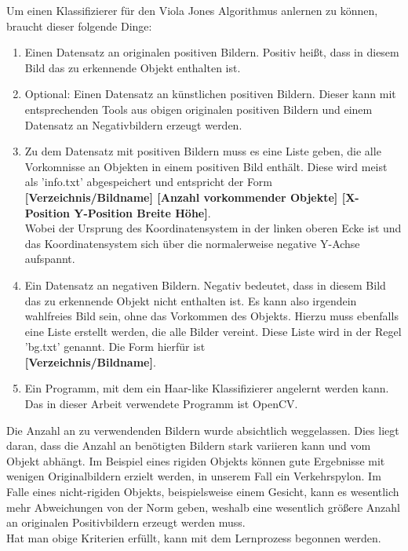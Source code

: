 Um einen Klassifizierer für den Viola Jones Algorithmus anlernen zu können, braucht dieser folgende Dinge:
\begin{enumerate}
\item Einen Datensatz an originalen positiven Bildern. Positiv heißt, dass in diesem Bild das zu erkennende Objekt enthalten ist.
\item Optional: Einen Datensatz an künstlichen positiven Bildern. Dieser kann mit entsprechenden Tools aus obigen originalen positiven Bildern und einem Datensatz an Negativbildern erzeugt werden.
\item Zu dem Datensatz mit positiven Bildern muss es eine Liste geben, die alle Vorkomnisse an Objekten in einem positiven Bild enthält. Diese wird meist als 'info.txt' abgespeichert und entspricht der Form \\
\textbf{[Verzeichnis/Bildname] [Anzahl vorkommender Objekte] [X-Position Y-Position Breite Höhe]}. \label{sec:info_txt}\\
Wobei der Ursprung des Koordinatensystem in der linken oberen Ecke ist und das Koordinatensystem sich über die normalerweise negative Y-Achse aufspannt.
\item Ein Datensatz an negativen Bildern. Negativ bedeutet, dass in diesem Bild das zu erkennende Objekt nicht enthalten ist. Es kann also irgendein wahlfreies Bild sein, ohne das Vorkommen des Objekts. Hierzu muss ebenfalls eine Liste erstellt werden, die alle Bilder vereint. Diese Liste wird in der Regel 'bg.txt' genannt. Die Form hierfür ist \\
\textbf{[Verzeichnis/Bildname]}.
\item Ein Programm, mit dem ein Haar-like Klassifizierer angelernt werden kann. Das in dieser Arbeit verwendete Programm ist OpenCV.
\end{enumerate}
Die Anzahl an zu verwendenden Bildern wurde absichtlich weggelassen. Dies liegt daran, dass die Anzahl an benötigten Bildern stark variieren kann und vom Objekt abhängt. Im Beispiel eines rigiden Objekts können gute Ergebnisse mit wenigen Originalbildern erzielt werden, in unserem Fall ein Verkehrspylon. Im Falle eines nicht-rigiden Objekts, beispielsweise einem Gesicht, kann es wesentlich mehr Abweichungen von der Norm geben, weshalb eine wesentlich größere Anzahl an originalen Positivbildern erzeugt werden muss. \\
Hat man obige Kriterien erfüllt, kann mit dem Lernprozess begonnen werden.